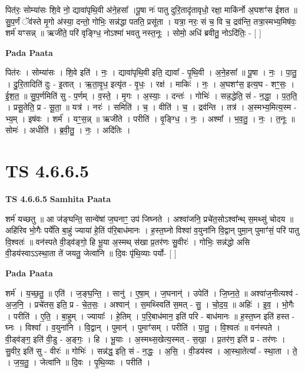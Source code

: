 \documentclass[17pt]{extarticle}
\begin{document}
पित॑रः॒ सोम्या॑सः शि॒वे नो॒ द्यावा॑पृथि॒वी अ॑ने॒हसा᳚ ।पू॒षा नः॑ पातु दुरि॒तादृ॑तावृधो॒ रक्षा॒ माकि॑र्नो अ॒घशꣳ॑स ईशत ॥ सु॒प॒र्णं ॅव॑स्ते मृ॒गो अ॑स्या॒ दन्तो॒ गोभिः॒ सन्न॑द्धा पतति॒ प्रसू॑ता । यत्रा॒ नरः॒ सं च॒ वि च॒ द्रव॑न्ति॒ तत्रा॒स्मभ्य॒मिष॑वः॒ शर्म॑ यꣳसन्न् ॥ ऋजी॑ते॒ परि॑ वृङ्ग्धि॒ नोऽश्मा॑ भवतु नस्त॒नूः । सोमो॒ अधि॑ ब्रवीतु॒ नोऽदि॑तिः॒ - [  ] \newline

\textbf{Pada Paata} \newline

पित॑रः । सोम्या॑सः । शि॒वे इति॑ । नः॒ । द्यावा॑पृथि॒वी इति॒ द्यावा᳚ - पृ॒थि॒वी । अ॒ने॒हसा᳚ ॥ पू॒षा । नः॒ । पा॒तु॒ । दु॒रि॒तादिति॑ दुः - इ॒तात् । ऋ॒ता॒वृ॒ध॒ इत्यृ॑त - वृ॒धः॒ । रक्ष॑ । माकिः॑ । नः॒ । अ॒घशꣳ॑स॒ इत्य॒घ - शꣳ॒॒सः॒ । ई॒श॒त॒ ॥ सु॒प॒र्णमिति॑ सु - प॒र्णम् । व॒स्ते॒ । मृ॒गः । अ॒स्याः॒ । दन्तः॑ । गोभिः॑ । सन्न॒द्धेति॒ सं - न॒द्धा॒ । प॒त॒ति॒ । प्रसू॒तेति॒ प्र - सू॒ता॒ ॥ यत्र॑ । नरः॑ । समिति॑ । च॒ । वीति॑ । च॒ । द्रव॑न्ति । तत्र॑ । अ॒स्मभ्य॒मित्य॒स्म - भ्य॒म् । इष॑वः । शर्म॑ । यꣳ॒॒स॒न्न् ॥ ऋजी॑ते । परीति॑ । वृ॒ङ्ग्धि॒ । नः॒ । अश्मा᳚ । भ॒व॒तु॒ । नः॒ । त॒नूः ॥ सोमः॑ । अधीति॑ । ब्र॒वी॒तु॒ । नः॒ । अदि॑तिः ।  \newline





\section{ TS 4.6.6.5 }

\textbf{TS 4.6.6.5 } \newline
\textbf{Samhita Paata} \newline

शर्म॑ यच्छतु ॥ आ ज॑ङ्घन्ति॒ सान्वे॑षां ज॒घनाꣳ॒॒ उप॑ जिघ्नते । अश्वा॑जनि॒ प्रचे॑त॒सोऽश्वा᳚न्थ् स॒मथ्सु॑ चोदय ॥ अहि॑रिव भो॒गैः पर्ये॑ति बा॒हुं ज्याया॑ हे॒तिं प॑रि॒बाध॑मानः । ह॒स्त॒घ्नो विश्वा॑ व॒युना॑नि वि॒द्वान् पुमा॒न् पुमाꣳ॑सं॒ परि॑ पातु वि॒श्वतः॑ ॥ वन॑स्पते वी॒ड्व॑ङ्गो॒ हि भू॒या अ॒स्मथ् स॑खा प्र॒तर॑णः सु॒वीरः॑ । गोभिः॒ सन्न॑द्धो असि वी॒डय॑स्वाऽऽस्था॒ता ते॑ जयतु॒ जेत्वा॑नि ॥ दि॒वः पृ॑थि॒व्याः पर्यो- [  ] \newline

\textbf{Pada Paata} \newline

शर्म॑ । य॒च्छ॒तु॒ ॥ एति॑ । ज॒ङ्घ॒न्ति॒ । सानु॑ । ए॒षा॒म् । ज॒घनान्॑ । उपेति॑ । जि॒घ्न॒ते॒ ॥ अश्वा॑ज॒नीत्यश्व॑ - अ॒ज॒नि॒ । प्रचे॑तस॒ इति॒ प्र - चे॒त॒सः॒ । अश्वान्॑ । स॒मथ्स्विति॑ स॒मत् - सु॒ । चो॒द॒य॒ ॥ अहिः॑ । इ॒व॒ । भो॒गैः । परीति॑ । ए॒ति॒ । बा॒हुम् । ज्यायाः᳚ । हे॒तिम् । प॒रि॒बाध॑मान॒ इति॑ परि - बाध॑मानः ॥ ह॒स्त॒घ्न इति॑ हस्त - घ्नः । विश्वा᳚ । व॒युना॑नि । वि॒द्वान् । पुमान्॑ । पुमाꣳ॑सम् । परीति॑ । पा॒तु॒ । वि॒श्वतः॑ ॥ वन॑स्पते । वी॒ड्व॑ङ्ग॒ इति॑ वी॒डु - अ॒ङ्गः॒ । हि । भू॒याः । अ॒स्मथ्स॒खेत्य॒स्मत् - स॒खा॒ । प्र॒तर॑ण॒ इति॑ प्र - तर॑णः । सु॒वीर॒ इति॑ सु - वीरः॑ ॥ गोभिः॑ । सन्न॑द्ध॒ इति॒ सं - न॒द्धः॒ । अ॒सि॒ । वी॒डय॑स्व । आ॒स्था॒तेत्या᳚ - स्था॒ता । ते॒ । ज॒य॒तु॒ । जेत्वा॑नि ॥ दि॒वः । पृ॒थि॒व्याः । परीति॑ ।  \newline
\end{document}
